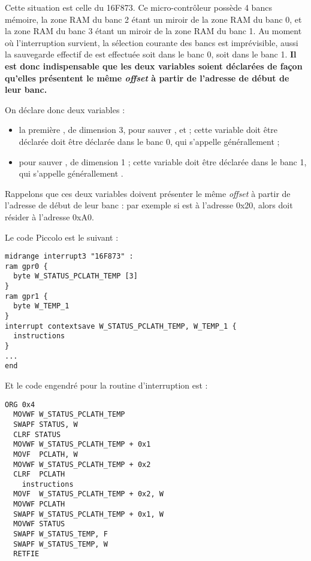 Cette situation est celle du 16F873. Ce micro-contrôleur possède 4 bancs mémoire, la zone RAM du banc 2 étant un miroir de la zone RAM du banc 0, et la zone RAM du banc 3 étant un miroir de la zone RAM du banc 1. Au moment où l'interruption survient, la sélection courante des bancs est imprévisible, aussi la sauvegarde effectif de  est effectuée soit dans le banc 0, soit dans le banc 1. \textbf{Il est donc indispensable que les deux variables soient déclarées de façon qu'elles présentent le même \emph{offset} à partir de l'adresse de début de leur banc.}

On déclare donc deux variables :
\begin{itemize}
  \item la première , de dimension 3, pour sauver ,  et  ; cette variable doit être déclarée doit être déclarée dans le banc 0, qui s'appelle générallement  ; 
  \item {} pour sauver , de dimension 1 ; cette variable doit être déclarée dans le banc 1, qui s'appelle générallement .

\end{itemize}

Rappelons que ces deux variables doivent présenter le même \emph{offset} à partir de l'adresse de début de leur banc : par exemple si  est à l'adresse 0x20, alors  doit résider à l'adresse 0xA0.

Le code Piccolo est le suivant :
\begin{lstlisting}[language=piccolo]
midrange interrupt3 "16F873" :
ram gpr0 {
  byte W_STATUS_PCLATH_TEMP [3]
}
ram gpr1 {
  byte W_TEMP_1
}
interrupt contextsave W_STATUS_PCLATH_TEMP, W_TEMP_1 {
  instructions
}
...
end
\end{lstlisting}

Et le code engendré pour la routine d'interruption est :
\begin{lstlisting}[language=assembleur]
  ORG 0x4
  MOVWF W_STATUS_PCLATH_TEMP
  SWAPF STATUS, W
  CLRF STATUS
  MOVWF W_STATUS_PCLATH_TEMP + 0x1
  MOVF  PCLATH, W
  MOVWF W_STATUS_PCLATH_TEMP + 0x2
  CLRF  PCLATH
    instructions
  MOVF  W_STATUS_PCLATH_TEMP + 0x2, W
  MOVWF PCLATH
  SWAPF W_STATUS_PCLATH_TEMP + 0x1, W
  MOVWF STATUS
  SWAPF W_STATUS_TEMP, F
  SWAPF W_STATUS_TEMP, W
  RETFIE
\end{lstlisting}









